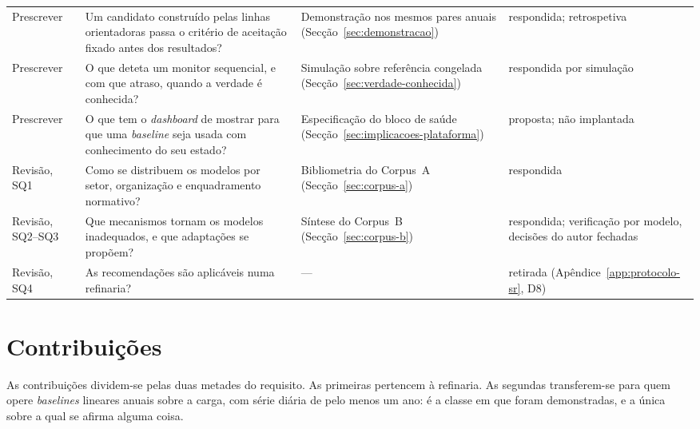 \begin{table}[htbp]
\begin{tabularx}{\linewidth}{@{}>{\raggedright\arraybackslash}p{1.7cm}>{\raggedright\arraybackslash}X>{\raggedright\arraybackslash}X>{\raggedright\arraybackslash}p{3.1cm}@{}}
    \addlinespace
    Prescrever & Um candidato construído pelas linhas orientadoras passa o critério de aceitação fixado antes dos resultados? & Demonstração nos mesmos pares anuais (Secção~\ref{sec:demonstracao}) & respondida; retrospetiva \\
    Prescrever & O que deteta um monitor sequencial, e com que atraso, quando a verdade é conhecida? & Simulação sobre referência congelada (Secção~\ref{sec:verdade-conhecida}) & respondida por simulação \\
    Prescrever & O que tem o \emph{dashboard} de mostrar para que uma \emph{baseline} seja usada com conhecimento do seu estado? & Especificação do bloco de saúde (Secção~\ref{sec:implicacoes-plataforma}) & proposta; não implantada \\
    \addlinespace
    Revisão, SQ1 & Como se distribuem os modelos por setor, organização e enquadramento normativo? & Bibliometria do Corpus~A (Secção~\ref{sec:corpus-a}) & respondida \\
    Revisão, SQ2--SQ3 & Que mecanismos tornam os modelos inadequados, e que adaptações se propõem? & Síntese do Corpus~B (Secção~\ref{sec:corpus-b}) & respondida; verificação por modelo, decisões do autor fechadas \\
    Revisão, SQ4 & As recomendações são aplicáveis numa refinaria? & --- & retirada (Apêndice~\ref{app:protocolo-sr}, D8) \\
    \bottomrule
  \end{tabularx}
\end{table}


\newpage 


\section{Contribuições}
\label{sec:contribuicoes}

As contribuições dividem-se pelas duas metades do requisito. As
primeiras pertencem à refinaria. As segundas transferem-se para quem
opere \emph{baselines} lineares anuais sobre a carga, com série diária
de pelo menos um ano: é a classe em que foram demonstradas, e a única
sobre a qual se afirma alguma coisa.

